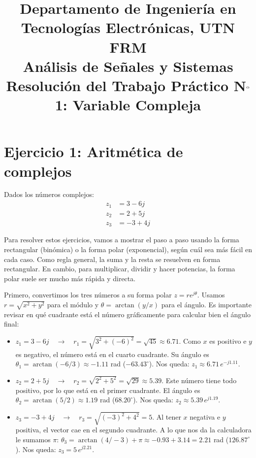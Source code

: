 \documentclass[10pt,a4paper]{article}
\title{%
	{\normalsize Departamento de Ingeniería en Tecnologías Electrónicas, UTN FRM}\\[0.1cm]
	{\large Análisis de Señales y Sistemas}\\[0.15cm]
	{\normalsize Resolución del Trabajo Práctico N$^{\text o}$1: Variable Compleja}%
}
\author{}
\date{}
\begin{document}
	\maketitle
	\thispagestyle{fancy}
	
	\label{sec:resolucion}

	\section*{Ejercicio 1: Aritmética de complejos}
	
	Dados los números complejos:
	\begin{align*}
		z_1 &= 3-6j \\
		z_2 &= 2+5j \\
		z_3 &= -3+4j
	\end{align*}
	
	Para resolver estos ejercicios, vamos a mostrar el paso a paso usando la forma rectangular (binómica) o la forma polar (exponencial), según cuál sea más fácil en cada caso. Como regla general, la suma y la resta se resuelven en forma rectangular. En cambio, para multiplicar, dividir y hacer potencias, la forma polar suele ser mucho más rápida y directa.

    Primero, convertimos los tres números a su forma polar $z = r e^{j\theta}$. Usamos $r = \sqrt{x^2+y^2}$ para el módulo y $\theta = \arctan(y/x)$ para el ángulo. Es importante revisar en qué cuadrante está el número gráficamente para calcular bien el ángulo final:
    \begin{itemize}
        \item $z_1 = 3-6j \quad\rightarrow\quad r_1 = \sqrt{3^2+(-6)^2} = \sqrt{45} \approx 6.71$. Como $x$ es positivo e $y$ es negativo, el número está en el cuarto cuadrante. Su ángulo es $\theta_1 = \arctan(-6/3) \approx -1.11$ rad ($-63.43^\circ$). Nos queda: $z_1 \approx 6.71\, e^{-j1.11}$.
        \item $z_2 = 2+5j \quad\rightarrow\quad r_2 = \sqrt{2^2+5^2} = \sqrt{29} \approx 5.39$. Este número tiene todo positivo, por lo que está en el primer cuadrante. El ángulo es $\theta_2 = \arctan(5/2) \approx 1.19$ rad ($68.20^\circ$). Nos queda: $z_2 \approx 5.39\, e^{j1.19}$.
        \item $z_3 = -3+4j \quad\rightarrow\quad r_3 = \sqrt{(-3)^2+4^2} = 5$. Al tener $x$ negativa e $y$ positiva, el vector cae en el segundo cuadrante. A lo que nos da la calculadora le sumamos $\pi$: $\theta_3 = \arctan(4/-3) + \pi \approx -0.93 + 3.14 = 2.21$ rad ($126.87^\circ$). Nos queda: $z_3 = 5\, e^{j2.21}$.
    \end{itemize}
	
\end{document}
